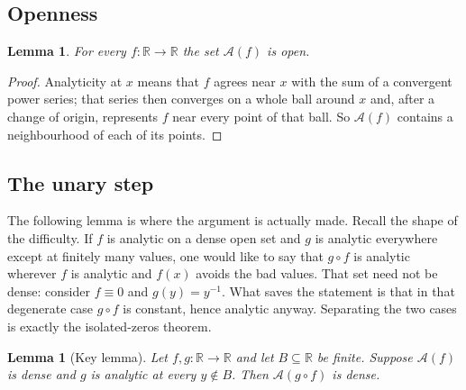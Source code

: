\documentclass[11pt,oneside]{article}
\newtheorem{lemma}[theorem]{Lemma}
\theoremstyle{definition}
\theoremstyle{remark}
\newcommand{\R}{\mathbb R}
\newcommand{\An}{\mathcal A}
\begin{document}
\subsection{Openness}

\begin{lemma}\label{lem:open}
For every $f\colon\R\to\R$ the set $\An(f)$ is open.
\end{lemma}

\begin{proof}
Analyticity at $x$ means that $f$ agrees near $x$ with the sum of a
convergent power series; that series then converges on a whole ball around
$x$ and, after a change of origin, represents $f$ near every point of that
ball.  So $\An(f)$ contains a neighbourhood of each of its points.
\end{proof}

\subsection{The unary step}

The following lemma is where the argument is actually made.  Recall the shape
of the difficulty.  If $f$ is analytic on a dense open set and $g$ is analytic
everywhere except at finitely many values, one would like to say that
$g\circ f$ is analytic wherever $f$ is analytic and $f(x)$ avoids the bad
values.  That set need not be dense: consider $f\equiv 0$ and $g(y)=y^{-1}$.
What saves the statement is that in that degenerate case $g\circ f$ is
constant, hence analytic anyway.  Separating the two cases is exactly the
isolated-zeros theorem.

\begin{lemma}[Key lemma]\label{lem:key}
Let $f,g\colon\R\to\R$ and let $B\subseteq\R$ be finite.  Suppose $\An(f)$ is
dense and $g$ is analytic at every $y\notin B$.  Then $\An(g\circ f)$ is
dense.
\end{lemma}
\end{document}

